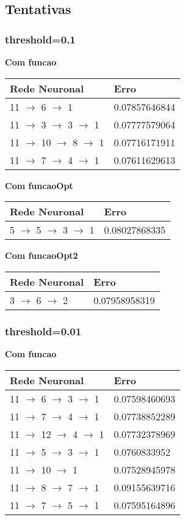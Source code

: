 \documentclass{article}
\begin{document}
\subsection{Tentativas}

\subsubsection{threshold=0.1}

\textbf{Com funcao}
\begin{center}
\begin{tabular}{ | l | l | }
\hline
Rede Neuronal & Erro\\ \hline
11 $\to$ 6 $\to$ 1 & 0.07857646844\\ \hline
11 $\to$ 3 $\to$ 3 $\to$ 1 & 0.07777579064\\ \hline
11 $\to$ 10 $\to$ 8 $\to$ 1 & 0.07716171911\\ \hline
11 $\to$ 7 $\to$ 4 $\to$ 1 & 0.07611629613\\ \hline
\end{tabular}
\end{center}

\textbf{Com funcaoOpt}
\begin{center}
\begin{tabular}{ | l | l | }
\hline
Rede Neuronal & Erro\\ \hline
5 $\to$ 5 $\to$ 3 $\to$ 1 & 0.08027868335\\ \hline
\end{tabular}
\end{center}

\textbf{Com funcaoOpt2}
\begin{center}
\begin{tabular}{ | l | l | }
\hline
Rede Neuronal & Erro\\ \hline
3 $\to$ 6 $\to$ 2 & 0.07958958319\\ \hline
\end{tabular}
\end{center}

\subsubsection{threshold=0.01}

\textbf{Com funcao}
\begin{center}
\begin{tabular}{ | l | l | }
\hline
Rede Neuronal & Erro\\ \hline
11 $\to$ 6 $\to$ 3 $\to$ 1 & 0.07598460693\\ \hline
11 $\to$ 7 $\to$ 4 $\to$ 1 & 0.07738852289\\ \hline
11 $\to$ 12 $\to$ 4 $\to$ 1 & 0.07732378969\\ \hline
11 $\to$ 5 $\to$ 3 $\to$ 1 & 0.0760833952\\ \hline
11 $\to$ 10 $\to$ 1 & 0.07528945978\\ \hline
11 $\to$ 8 $\to$ 7 $\to$ 1 & 0.09155639716\\ \hline
11 $\to$ 7 $\to$ 5 $\to$ 1 & 0.07595164896\\ \hline
\end{tabular}
\end{center}
\end{document}
